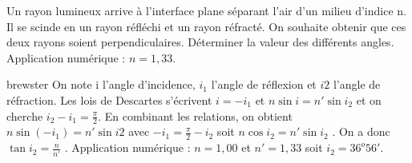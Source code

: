 \begin{Exercise}[title=Indice de Brewster]
Un rayon lumineux arrive à l’interface plane séparant l’air d’un milieu d’indice n. Il se scinde
en un rayon réfléchi et un rayon réfracté. On souhaite obtenir que ces deux rayons soient
perpendiculaires. Déterminer la valeur des différents angles.
Application numérique : $n = 1, 33.$
\end{Exercise}
\begin{Answer}
{brewster}
On note i l’angle d’incidence, $i_1$ l’angle de réflexion et $i 2$ l’angle de réfraction. Les lois de Descartes s’écrivent $i = - i_1$ et $n \sin i = n'\sin i_2 $ et on cherche $i_2-i_1 = \frac{\pi}{2}$. En combinant les relations, on obtient $n\sin(-i_1 ) = n'\sin i 2$ avec $-i_1 = \frac{\pi}{2}-i_2$ soit $n \cos i_2 = n' \sin i_2$ . On a donc $\tan i_2 = \frac{n}{n'}$ .
Application numérique : $n = 1, 00$ et $n' = 1, 33$ soit $i_2 = 36^o 56'$.
\end{Answer}
